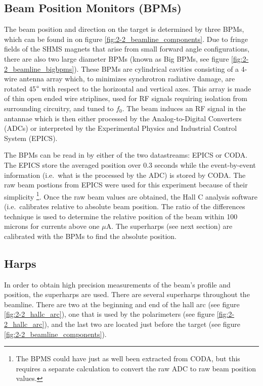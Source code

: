 \documentclass[
]{report}
\begin{document}
\hypertarget{beam-position-monitors-bpms}{%
\subsection{Beam Position Monitors
(BPMs)}\label{beam-position-monitors-bpms}}

The beam position and direction on the target is determined by three
BPMs, which can be found in on figure \ref{fig:2-2_beamline_components}.
Due to fringe fields of the SHMS magnets that arise from small forward
angle configurations, there are also two large diameter BPMs (known as
Big BPMs, see figure \ref{fig:2-2_beamline_bigbpms}). These BPMs are
cylindrical cavities consisting of a 4-wire antenna array which, to
minimizes synchrotron radiative damage, are rotated 45\(\degree\) with
respect to the horizontal and vertical axes. This array is made of thin
open ended wire striplines, used for RF signals requiring isolation from
surrounding circuitry, and tuned to \(f_0\). The beam induces an RF
signal in the antannae which is then either processed by the
Analog-to-Digital Converters (ADCs) or interpreted by the Experimental
Physics and Industrial Control System (EPICS).



The BPMs can be read in by either of the two datastreams: EPICS or CODA.
The EPICS store the averaged position over 0.3 seconds while the
event-by-event information (i.e.~what is the processed by the ADC) is
stored by CODA. The raw beam postions from EPICS were used for this
experiment because of their simplicity
\footnote{The BPMS could have just as well been extracted from CODA, but this requires a separate calculation to convert the raw ADC to raw beam position values.}.
Once the raw beam values are obtained, the Hall C analysis software
(i.e.~calibrates relative to absolute beam position. The ratio of the
differences technique is used to determine the relative position of the
beam within 100 microns for currents above one \(\mu\)A. The superharps
(see next section) are calibrated with the BPMs to find the absolute
position.



\hypertarget{harps}{%
\subsection{Harps}\label{harps}}

In order to obtain high precision measurements of the beam's profile and
position, the superharps are used. There are several superharps
throughout the beamline. There are two at the beginning and end of the
hall arc (see figure \ref{fig:2-2_hallc_arc}), one that is used by the
polarimeters (see figure \ref{fig:2-2_hallc_arc}), and the last two are
located just before the target (see figure
\ref{fig:2-2_beamline_components}).
\end{document}
